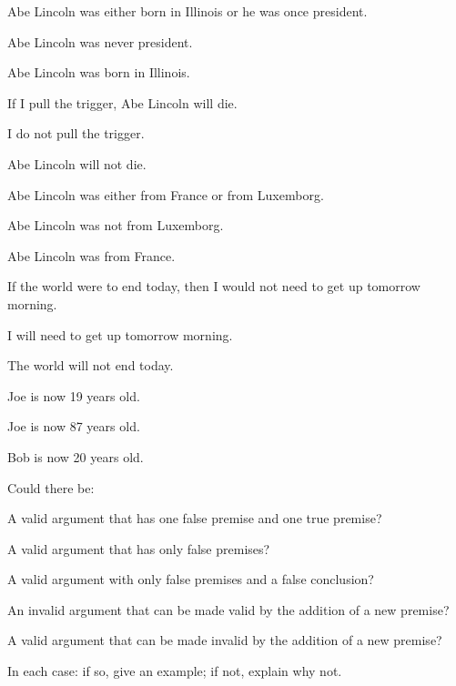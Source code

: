 \begin{earg}
\item Abe Lincoln was either born in Illinois or he was once president.
\item Abe Lincoln was never president.
\item[\therefore] Abe Lincoln was born in Illinois.
\end{earg}

\begin{earg}
\item If I pull the trigger, Abe Lincoln will die.
\item I do not pull the trigger.
\item[\therefore] Abe Lincoln will not die.
\end{earg}

\begin{earg}
\item Abe Lincoln was either from France or from Luxemborg.
\item Abe Lincoln was not from Luxemborg.
\item[\therefore] Abe Lincoln was from France.
\end{earg}

\begin{earg}
\item If the world were to end today, then I would not need to get up tomorrow morning.
\item I will need to get up tomorrow morning.
\item[\therefore] The world will not end today.
\end{earg}

\begin{earg}
\item Joe is now 19 years old.
\item Joe is now 87 years old.
\item[\therefore] Bob is now 20 years old.
\end{earg}

\problempart
\label{pr.EnglishCombinations}
Could there be:
	\begin{earg}
		\item A valid argument that has one false premise and one true premise?
		\item A valid argument that has only false premises?
		\item A valid argument with only false premises and a false conclusion?
		\item An invalid argument that can be made valid by the addition of a new premise?
		\item A valid argument that can be made invalid by the addition of a new premise?
	\end{earg}
In each case: if so, give an example; if not, explain why not.


